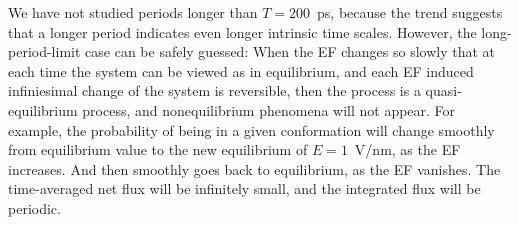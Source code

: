 \documentclass[a4paper,preprint,unsortedaddress,onecolumn]{revtex4-1}
\newcommand{\recheck}[1]{{\color{red} #1}}
\begin{document}
We have not studied periods longer than $T=200$~ps, because
the trend suggests that a longer period indicates even longer intrinsic time scales.
However, the long-period-limit case can be safely guessed: When
the EF changes so slowly that
at each time the system
can be viewed as in equilibrium, and
\recheck{each EF induced infiniesimal change of the system is reversible},
then the process is a quasi-equilibrium
process,
and nonequilibrium phenomena will not appear. For example,
the probability of being in a given conformation will change
smoothly from equilibrium value to the new equilibrium of $E=1$~V/nm, as
the EF increases.
And then smoothly goes back to equilibrium, as the EF vanishes.
The time-averaged net flux will be infinitely small,
and the integrated flux will be \recheck{periodic.}






\end{document}
